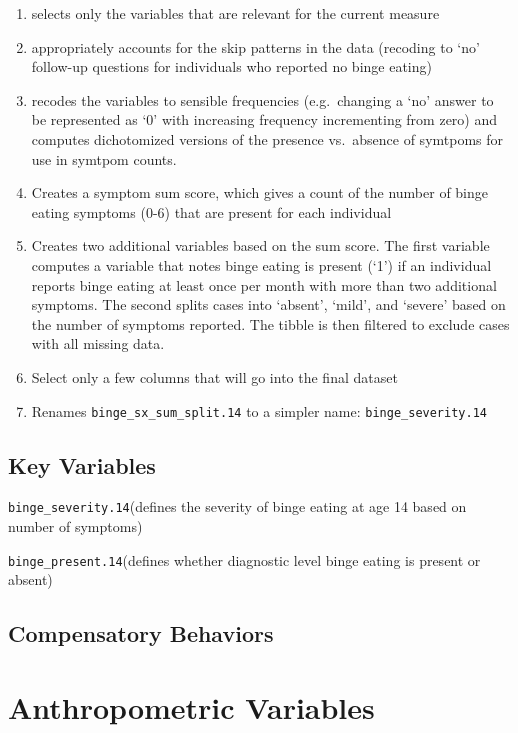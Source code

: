 \documentclass[
]{book}
\begin{document}
\begin{enumerate}
\def\labelenumi{(\arabic{enumi})}
\item
  selects only the variables that are relevant for the current measure
\item
  appropriately accounts for the skip patterns in the data (recoding to `no' follow-up questions for individuals who reported no binge eating)
\item
  recodes the variables to sensible frequencies (e.g.~changing a `no' answer to be represented as `0' with increasing frequency incrementing from zero) and computes dichotomized versions of the presence vs.~absence of symtpoms for use in symtpom counts.
\item
  Creates a symptom sum score, which gives a count of the number of binge eating symptoms (0-6) that are present for each individual
\item
  Creates two additional variables based on the sum score. The first variable computes a variable that notes binge eating is present (`1') if an individual reports binge eating at least once per month with more than two additional symptoms. The second splits cases into `absent', `mild', and `severe' based on the number of symptoms reported. The tibble is then filtered to exclude cases with all missing data.
\item
  Select only a few columns that will go into the final dataset
\item
  Renames \texttt{binge\_sx\_sum\_split.14} to a simpler name: \texttt{binge\_severity.14}
\end{enumerate}

\hypertarget{key-variables-1}{%
\section{Key Variables}\label{key-variables-1}}

\texttt{binge\_severity.14}(defines the severity of binge eating at age 14 based on number of symptoms)

\texttt{binge\_present.14}(defines whether diagnostic level binge eating is present or absent)

\hypertarget{compensatory-behaviors}{%
\section{Compensatory Behaviors}\label{compensatory-behaviors}}

\hypertarget{anthropometric-variables}{%
\chapter{Anthropometric Variables}\label{anthropometric-variables}}
\end{document}
